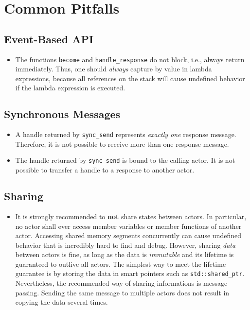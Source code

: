 \section{Common Pitfalls}
\label{Sec::Pitfalls}

\subsection{Event-Based API}

\begin{itemize}
\item The functions \lstinline^become^ and \lstinline^handle_response^ do not block, i.e., always return immediately.
Thus, one should \textit{always} capture by value in lambda expressions, because all references on the stack will cause undefined behavior if the lambda expression is executed.
\end{itemize}

\subsection{Synchronous Messages}

\begin{itemize}

\item
A handle returned by \lstinline^sync_send^ represents \emph{exactly one} response message.
Therefore, it is not possible to receive more than one response message.

\item
The handle returned by \lstinline^sync_send^ is bound to the calling actor.
It is not possible to transfer a handle to a response to another actor.

\end{itemize}

\subsection{Sharing}

\begin{itemize}
\item It is strongly recommended to \textbf{not} share states between actors.
In particular, no actor shall ever access member variables or member functions of another actor.
Accessing shared memory segments concurrently can cause undefined behavior that is incredibly hard to find and debug.
However, sharing \textit{data} between actors is fine, as long as the data is \textit{immutable} and its lifetime is guaranteed to outlive all actors.
The simplest way to meet the lifetime guarantee is by storing the data in smart pointers such as \lstinline^std::shared_ptr^.
Nevertheless, the recommended way of sharing informations is message passing.
Sending the same message to multiple actors does not result in copying the data several times.
\end{itemize}

